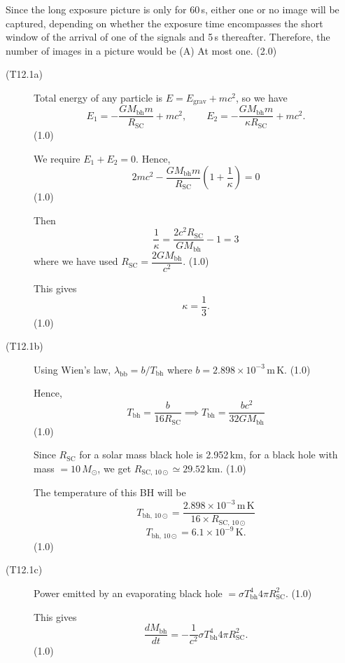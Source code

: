 \begin{description}
  Since the long exposure picture is only for 60\,s, either one or no image
  will be captured, depending on whether the exposure time encompasses the
  short window of the arrival of one of the signals and 5\,s thereafter.
  Therefore, the number of images in a picture would be (A) At most one.
  \hfill(2.0)
\end{description}

\begin{description}
\item[(T12.1a)] Total energy of any particle is
  $E = E_{\mathrm{grav}} + mc^2$, so we have
  \[
    E_1 = -\frac{G M_{\mathrm{bh}} m}{R_{\mathrm{SC}}} + mc^2, \qquad
    E_2 = -\frac{G M_{\mathrm{bh}} m}{\kappa R_{\mathrm{SC}}} + mc^2.
  \]
  \hfill(1.0)

  We require $E_1 + E_2 = 0$. Hence,
  \[
    2mc^2 - \frac{G M_{\mathrm{bh}} m}{R_{\mathrm{SC}}}
    \left(1 + \frac{1}{\kappa}\right) = 0
  \]
  \hfill(1.0)

  Then
  \[
    \frac{1}{\kappa} = \frac{2 c^2 R_{\mathrm{SC}}}{G M_{\mathrm{bh}}} - 1 = 3
  \]
  where we have used
  $R_{\mathrm{SC}} = \dfrac{2 G M_{\mathrm{bh}}}{c^2}$. \hfill(1.0)

  This gives
  \[
    \kappa = \frac{1}{3}.
  \]
  \hfill(1.0)

\item[(T12.1b)] Using Wien's law,
  $\lambda_{\mathrm{bb}} = b/T_{\mathrm{bh}}$ where
  $b = 2.898 \times 10^{-3}$\,m\,K. \hfill(1.0)

  Hence,
  \[
    T_{\mathrm{bh}} = \frac{b}{16 R_{\mathrm{SC}}}
    \implies T_{\mathrm{bh}} = \frac{b c^2}{32 G M_{\mathrm{bh}}}
  \]
  \hfill(1.0)

  Since $R_{\mathrm{SC}}$ for a solar mass black hole is 2.952\,km, for a
  black hole with mass $= 10\,M_\odot$, we get
  $R_{\mathrm{SC,\,10\odot}} \simeq 29.52$\,km. \hfill(1.0)

  The temperature of this BH will be
  \[
    T_{\mathrm{bh,\,10\odot}}
    = \frac{2.898 \times 10^{-3}\,\mathrm{m\,K}}{16 \times
      R_{\mathrm{SC,\,10\odot}}}
  \]
  \[
    T_{\mathrm{bh,\,10\odot}} = 6.1 \times 10^{-9}\,\mathrm{K}.
  \]
  \hfill(1.0)

\item[(T12.1c)] Power emitted by an evaporating black hole
  $= \sigma T_{\mathrm{bh}}^4 4\pi R_{\mathrm{SC}}^2$. \hfill(1.0)

  This gives
  \[
    \frac{dM_{\mathrm{bh}}}{dt}
    = -\frac{1}{c^2}\sigma T_{\mathrm{bh}}^4 4\pi R_{\mathrm{SC}}^2.
  \]
  \hfill(1.0)


\end{description}
